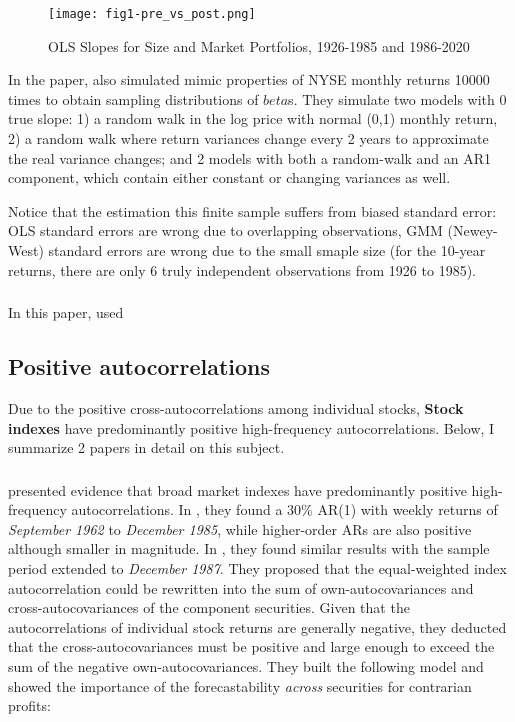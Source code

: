 \begin{figure}[ht]
    \texttt{[image: fig1-pre\_vs\_post.png]}
    \centering
    \caption{OLS Slopes for Size and Market Portfolios, 1926-1985 and 1986-2020}\label{fig1-pre_vs_post}
\end{figure}

In the paper, \citeauthor{fama1988permanent} also simulated mimic properties of NYSE monthly returns 10000 times to obtain sampling distributions of $beta$s. They simulate two models with 0 true slope: 1) a random walk in the log price with normal (0,1) monthly return,
2) a random walk where return variances change every 2 years to approximate the real variance changes; and 2 models with both a random-walk and an AR1 component, which contain either constant or changing variances as well.

Notice that the estimation this finite sample suffers from biased standard error: OLS standard errors are wrong due to overlapping observations, GMM (Newey-West) standard errors are wrong due to the small smaple size (for the 10-year returns, there are only 6 truly independent observations from 1926 to 1985).

\subsubsection{\citet{poterba1988mean}}\label{chap1:sec2:ssec1:paper2}
In this paper, \citeauthor{poterba1988mean} used 

\subsection{Positive autocorrelations}\label{chap1:sec2:ssec2}
Due to the positive cross-autocorrelations among individual stocks, \textbf{Stock indexes} have predominantly
positive high-frequency autocorrelations. Below, I summarize 2 papers in detail on this subject.

\subsubsection{\citet{lo1988stock,lo1990contrarian}}\label{chap1:sec2:ssec2:paper1}
\citet{lo1988stock,lo1990contrarian} presented evidence that broad market indexes have predominantly positive
high-frequency autocorrelations. In \citeyear{lo1988stock}, they found a 30\% AR(1) with weekly returns
of \textit{September 1962} to \textit{December 1985}, while higher-order ARs are also positive although smaller in magnitude.
In \citeyear{lo1990contrarian}, they found similar results with the sample period extended to \textit{December 1987}.
They proposed that the equal-weighted index autocorrelation could be rewritten into the sum of own-autocovariances
and cross-autocovariances of the component securities. Given that the autocorrelations of individual stock returns
are generally negative, they deducted that the cross-autocovariances must be positive and large enough to exceed the sum
of the negative own-autocovariances. They built the following model and showed the importance of the forecastability 
\textit{across} securities for contrarian profits:


